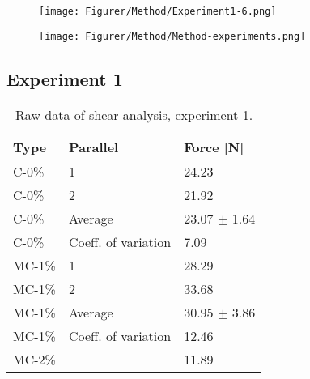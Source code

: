 \begin{figure}[H]
    \centering
    \begin{floatrow}
    \captionsetup{justification=raggedright,
    singlelinecheck=false}
    
      {\texttt{[image: Figurer/Method/Experiment1-6.png]}}
      
      {\texttt{[image: Figurer/Method/Method-experiments.png]}}

    \end{floatrow}
\end{figure}


\subsection{Experiment 1}
\begin{table}[H]
    \caption{Raw data of shear analysis, experiment 1.}
    \centering
    \begin{tabular}{ll|l}
\toprule

\textbf{Type} & \textbf{Parallel}  & \textbf{Force [N]}\\

\hline
C-0\%       &    1      & 24.23 \\
C-0\%       &    2      & 21.92 \\
C-0\%       & Average   & 23.07 $\pm$ 1.64\\
C-0\%       & Coeff. of variation & 7.09 \\
\hline
MC-1\%       &   1       & 28.29 \\
MC-1\%       &   2       & 33.68 \\
MC-1\%       & Average   & 30.95 $\pm$ 3.86 \\
MC-1\%       & Coeff. of variation & 12.46 \\
\hline
MC-2\%       &          & 11.89 \\
\bottomrule
    \end{tabular}%
    \label{tab:RawData:ShearForce:Exp1}
\end{table}

